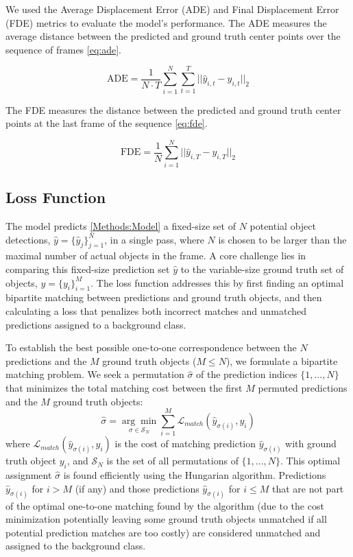 We used the Average Displacement Error (ADE) and Final Displacement Error (FDE) metrics to evaluate the model's performance. The ADE measures the average distance between the predicted and ground truth center points over the sequence of frames \ref{eq:ade}.

\begin{equation}
    \text{ADE} = \frac{1}{N \cdot T} \sum_{i=1}^{N} \sum_{t=1}^{T} || \hat{y}_{i,t} - y_{i,t} ||_2
    \label{eq:ade}
\end{equation}

The FDE measures the distance between the predicted and ground truth center points at the last frame of the sequence \ref{eq:fde}.

\begin{equation}
    \text{FDE} = \frac{1}{N} \sum_{i=1}^{N} || \hat{y}_{i,T} - y_{i,T} ||_2
    \label{eq:fde}
\end{equation}

\subsection{Loss Function} \label{Methods:LossFunction}

The model predicts \ref{Methods:Model} a fixed-size set of $N$ potential object detections, $ \hat{y} = \{\hat{y}_j\}_{j=1}^N $, in a single pass, where $N$ is chosen to be larger than the maximal number of actual objects in the frame. A core challenge lies in comparing this fixed-size prediction set $ \hat{y} $ to the variable-size ground truth set of objects, $ y = \{y_i\}_{i=1}^M $. The loss function addresses this by first finding an optimal bipartite matching between predictions and ground truth objects, and then calculating a loss that penalizes both incorrect matches and unmatched predictions assigned to a background class.

To establish the best possible one-to-one correspondence between the $N$ predictions and the $M$ ground truth objects ($M \le N$), we formulate a bipartite matching problem. We seek a permutation $ \hat{\sigma} $ of the prediction indices $ \{1, ..., N\} $ that minimizes the total matching cost between the first $M$ permuted predictions and the $M$ ground truth objects:
\begin{equation}
    \hat{\sigma} = \underset{\sigma \in \mathcal{S}_N}{\arg\min} \sum_{i=1}^M \mathcal{L}_{match}(\hat{y}_{\sigma(i)}, y_i)
    \label{eq:matching_argmin}
\end{equation}
where $ \mathcal{L}_{match}(\hat{y}_{\sigma(i)}, y_i) $ is the cost of matching prediction $ \hat{y}_{\sigma(i)} $ with ground truth object $ y_i $, and $ \mathcal{S}_N $ is the set of all permutations of $ \{1, ..., N\} $. This optimal assignment $ \hat{\sigma} $ is found efficiently using the Hungarian algorithm. Predictions $ \hat{y}_{\sigma(i)} $ for $ i > M $ (if any) and those predictions $ \hat{y}_{\sigma(i)} $ for $ i \le M $ that are not part of the optimal one-to-one matching found by the algorithm (due to the cost minimization potentially leaving some ground truth objects unmatched if all potential prediction matches are too costly) are considered unmatched and assigned to the background class.

